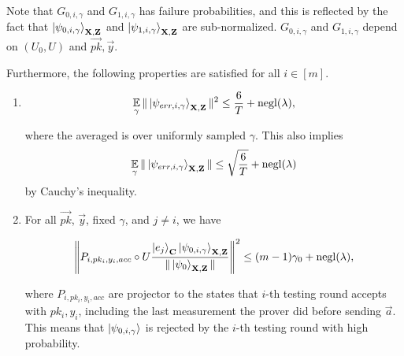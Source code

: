 \begin{lemma}
	Note that $G_{0,i,\gamma}$ and $G_{1,i,\gamma}$ has failure probabilities, and this is reflected by the fact that $\ket{\psi_{0,i,\gamma}}_{\mathbf{X},\mathbf{Z}}$ and $\ket{\psi_{1,i,\gamma}}_{\mathbf{X},\mathbf{Z}}$ are  sub-normalized. $G_{0,i,\gamma}$ and $G_{1,i,\gamma}$ depend on $(U_0,U)$ and $\vec{pk},\vec{y}$.



	Furthermore, the following properties are satisfied for all $i\in[m]$.
	\begin{enumerate}
		\item \label{property:partition-err}  $$\operatorname*{\mathbb{E}}_{\gamma}\|\ket{\psi_{err,i,\gamma}}_{\mathbf{X},\mathbf{Z}}\|^2 \leq \frac{6}{T}+\operatorname{negl}(\lambda),$$

			where the averaged is over uniformly sampled $\gamma$. This also implies
			\begin{align}
				\operatorname*{\mathbb{E}}_{\gamma}\|\ket{\psi_{err,i,\gamma}}_{\mathbf{X},\mathbf{Z}}\| \leq \sqrt{\frac{6}{T}}+\operatorname{negl}(\lambda)
			\end{align}
			by Cauchy's inequality.

		\item \label{property:partition-testing}
			For all $\vec{pk}$, $\vec{y}$, fixed $\gamma$, and  $j\neq i$, we have


			\begin{align}
				\left\lVert P_{i,pk_i,y_i,acc} \circ U\frac{\ket{e_j}_{\mathbf{C}}\ket{\psi_{0,i,\gamma}}_{\mathbf{X},\mathbf{Z}}}{\|\ket{\psi_0}_{\mathbf{X},\mathbf{Z}}\|}\right\rVert^2 \leq (m-1)\gamma_0+\operatorname{negl}(\lambda),
			\end{align}


			where $P_{i,pk_i,y_i,acc}$ are projector to the states that $i$-th testing round accepts with $pk_i,y_i$, including the last measurement the prover did before sending $\vec{a}$.  This means that $\ket{\psi_{0,i,\gamma}}$ is rejected by the $i$-th testing round with high probability.



\end{enumerate}
\end{lemma}
